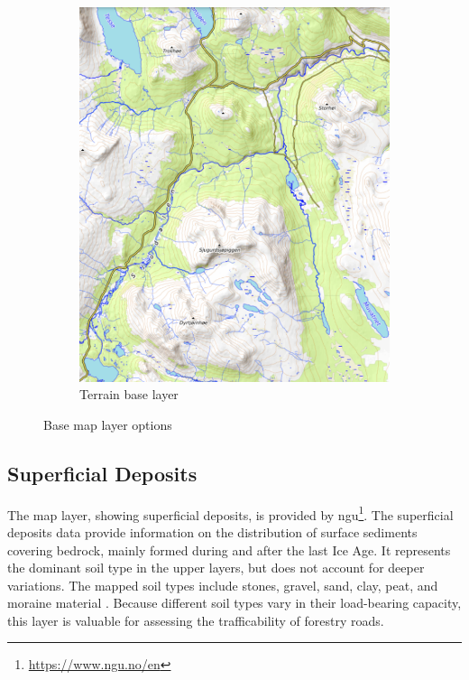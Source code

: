 \begin{figure}[h]
\begin{subfigure}[b]{0.45\textwidth}
     \end{subfigure}
     \hfill
     \begin{subfigure}[b]{0.45\textwidth}
         \centering
         \includegraphics[width=\textwidth]{figures/base_layer_topo.pdf}
         \caption{Terrain base layer}
         \label{fig:maplayers:topolayer}
     \end{subfigure}
    \caption{Base map layer options}
    \label{fig:maplayer:baselayers}
\end{figure}

\subsection{Superficial Deposits}\label{subsec:superficialdeposits}

The map layer, showing superficial deposits, is provided by \acrfull{ngu}\footnote{\url{https://www.ngu.no/en}}. The superficial deposits data provide information on the distribution of surface sediments covering bedrock, mainly formed during and after the last Ice Age. It represents the dominant soil type in the upper layers, but does not account for deeper variations. The mapped soil types include stones, gravel, sand, clay, peat, and \gls{moraine} material \cite{geonorge_losmasser}. Because different soil types vary in their load-bearing capacity, this layer is valuable for assessing the trafficability of forestry roads.

